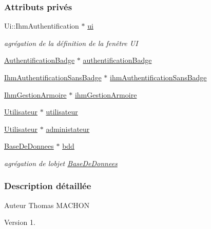 \subsubsection*{Attributs privés}
\begin{DoxyCompactItemize}
\item 
Ui\+::\+Ihm\+Authentification $\ast$ \hyperlink{class_ihm_authentification_a2bab782e7f65474f2817c3916ded9d18}{ui}
\begin{DoxyCompactList}\small\item\em agrégation de la définition de la fenêtre UI \end{DoxyCompactList}\item 
\hyperlink{class_authentification_badge}{Authentification\+Badge} $\ast$ \hyperlink{class_ihm_authentification_ac257a02215ec8d5d31e5a1def0c0e86d}{authentification\+Badge}
\item 
\hyperlink{class_ihm_authentification_sans_badge}{Ihm\+Authentification\+Sans\+Badge} $\ast$ \hyperlink{class_ihm_authentification_a9444198403beeaf7386488d56f8ad7f2}{ihm\+Authentification\+Sans\+Badge}
\item 
\hyperlink{class_ihm_gestion_armoire}{Ihm\+Gestion\+Armoire} $\ast$ \hyperlink{class_ihm_authentification_a6ce06a3dbea8b929c3ddffdba011c01f}{ihm\+Gestion\+Armoire}
\item 
\hyperlink{class_utilisateur}{Utilisateur} $\ast$ \hyperlink{class_ihm_authentification_ad08cee96c59182c27198907491f0c963}{utilisateur}
\item 
\hyperlink{class_utilisateur}{Utilisateur} $\ast$ \hyperlink{class_ihm_authentification_aba994da3a596cab04e35bfbca3e3b1a2}{administateur}
\item 
\hyperlink{class_base_de_donnees}{Base\+De\+Donnees} $\ast$ \hyperlink{class_ihm_authentification_ac87969204d55c2ab399498d4248172c0}{bdd}
\begin{DoxyCompactList}\small\item\em agrégation de l\textquotesingle{}objet \hyperlink{class_base_de_donnees}{Base\+De\+Donnees} \end{DoxyCompactList}\end{DoxyCompactItemize}


\subsubsection{Description détaillée}
\begin{DoxyAuthor}{Auteur}
Thomas M\+A\+C\+H\+ON
\end{DoxyAuthor}
\begin{DoxyVersion}{Version}
1. 
\end{DoxyVersion}


